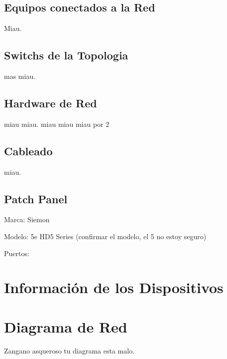 \documentclass[spanish]{udpreport}
\begin{document}
\section{Equipos conectados a la Red}
Miau.

\section{Switchs de la Topologia}
mas miau.

\section{Hardware de Red}
miau miau.
miau miau miau por 2

\section{Cableado}
miau.

\section{Patch Panel}
Marca: Siemon

Modelo: 5e HD5 Series (confirmar el modelo, el 5 no estoy seguro)

Puertos:

\chapter{Información de los Dispositivos}

\chapter{Diagrama de Red}
Zangano asqueroso tu diagrama esta malo.

\listoffigures
\end{document}
